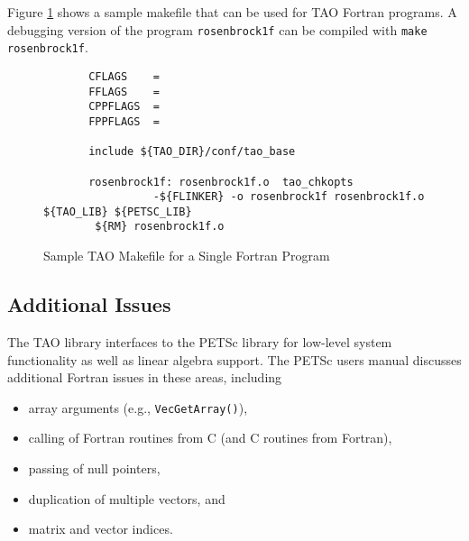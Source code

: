 Figure \ref{fig:make4} shows a sample makefile that can be used for
TAO Fortran programs.  A debugging version of the program 
{\tt rosenbrock1f} can be compiled with {\tt make rosenbrock1f}.

\begin{figure}[tbh]
{\footnotesize
\begin{verbatim}   
       CFLAGS    = 
       FFLAGS    = 
       CPPFLAGS  =
       FPPFLAGS  =
       
       include ${TAO_DIR}/conf/tao_base
   
       rosenbrock1f: rosenbrock1f.o  tao_chkopts
                 -${FLINKER} -o rosenbrock1f rosenbrock1f.o ${TAO_LIB} ${PETSC_LIB}
        ${RM} rosenbrock1f.o
\end{verbatim} %
\noindent
}
\caption{Sample TAO Makefile for a Single Fortran Program}
\label{fig:make4}
\end{figure}

\subsection{Additional Issues}

The TAO library interfaces to the PETSc library for
low-level system functionality as well as linear algebra support.  The
PETSc users manual discusses additional Fortran issues in these areas,
including
\begin{itemize}
\item array arguments (e.g., {\tt VecGetArray()}),
\item calling of Fortran routines from C (and C routines from Fortran),
\item passing of null pointers,
\item duplication of multiple vectors, and
\item matrix and vector indices.
\end{itemize}

